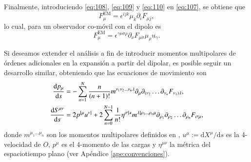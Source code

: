 Finalmente, introduciendo \eqref{eq:108}, \eqref{eq:109} y \eqref{eq:110} en \eqref{eq:107}, se obtiene que
\begin{equation}
F^{\mathrm{EM}}_{\mu} = \epsilon^{i j k} \mu_k \partial_i F_{\mu j},
\end{equation}
lo cual, para un observador co-móvil con el dipolo es
\begin{equation}
F^{\mathrm{EM}}_{\mu} = \epsilon^{\gamma \nu \sigma \rho} \partial_{\nu} F_{\mu \sigma} \mu_{\rho} u_{\gamma}.
\end{equation}

Si deseamos extender el análisis a fin de introducir momentos multipolares de órdenes adicionales en la expansión a partir del dipolar, es posible seguir un desarrollo similar, obteniendo que las ecuaciones de movimiento son
\begin{align}
\label{eq:111}
\dv{p_{\mu}}{s} &= -\sum_{n=1}^N \frac{n}{(n+1)!} m^{\nu_1 \nu_2 \dots \nu_n \lambda} \partial_{\mu} \partial_{(\nu_2} \dots \partial_{\nu_n} F_{\nu_1) \lambda},\\
\label{eq:112}
\dv{S^{\mu \nu}}{s} &= 2 p^{[\mu} u^{\nu]} + 2 \sum_{n=0}^{N-1} \frac{1}{n!} \eta^{\sigma [\kappa} m^{\lambda] \rho_1 \dots \rho_n \mu} \partial_{\rho_1} \partial_{\rho_2} \dots \partial_{\rho_n} F_{\sigma \mu},
\end{align}
donde $m^{\mu_1 \dots \mu_n}$ son los momentos multipolares definidos en \cite{Dixon1, Dixon2, Dixon3}, $u^{\mu} := \mathrm{d} X^{\mu} / \mathrm{d}s$ es la 4-velocidad de $O$, $p^{\mu}$ es el 4-momento de las cargas y $\eta^{\mu \nu}$ la métrica del espaciotiempo plano (ver Apéndice \ref{ape:convenciones}).